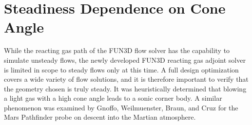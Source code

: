 \section{Steadiness Dependence on Cone Angle}

While the reacting gas path of the FUN3D flow solver has the capability to
simulate unsteady flows, the newly developed FUN3D reacting gas adjoint solver
is limited in scope to steady flows only at this time.  A full design
optimization covers a wide variety of flow solutions, and it is therefore
important to verify that the geometry chosen is truly steady.  It was
heuristically determined that blowing a light gas with a high cone angle leads
to a sonic corner body.  A similar phenomenon was examined by Gnoffo,
Weilmuenster, Braun, and Cruz\cite{gnoffo1996influence} for the Mars Pathfinder
probe on descent into the Martian atmosphere.
